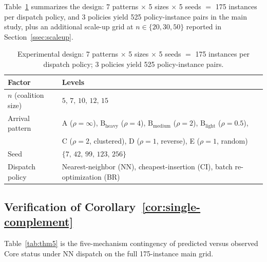 \documentclass[11pt]{article}
\theoremstyle{plain}
\theoremstyle{definition}
\theoremstyle{remark}
\begin{document}
Table~\ref{tab:design} summarizes the design: 7 patterns $\times$ 5 sizes $\times$ 5 seeds $=$ 175 instances per dispatch policy, and 3 policies yield 525 policy-instance pairs in the main study, plus an additional scale-up grid at $n\in\{20,30,50\}$ reported in Section~\ref{ssec:scaleup}.

\begin{table}[t]
\centering
\caption{Experimental design: 7 patterns $\times$ 5 sizes $\times$ 5 seeds $=$ 175 instances per dispatch policy; 3 policies yield 525 policy-instance pairs.}
\label{tab:design}
\small
\begin{tabular}{@{}ll@{}}
\toprule
Factor & Levels \\
\midrule
$n$ (coalition size) & $5,\,7,\,10,\,12,\,15$ \\
Arrival pattern & A ($\rho=\infty$), $\text{B}_{\text{heavy}}$ ($\rho=4$), $\text{B}_{\text{medium}}$ ($\rho=2$), $\text{B}_{\text{light}}$ ($\rho=0.5$), \\
                & C ($\rho=2$, clustered), D ($\rho=1$, reverse), E ($\rho=1$, random) \\
Seed & $\{7,\,42,\,99,\,123,\,256\}$ \\
Dispatch policy & Nearest-neighbor (NN), cheapest-insertion (CI), batch re-optimization (BR) \\
\bottomrule
\end{tabular}
\end{table}

\subsection{Verification of Corollary~\ref{cor:single-complement}}

Table~\ref{tab:thm5} is the five-mechanism contingency of predicted versus observed Core status under NN dispatch on the full 175-instance main grid.
\end{document}
